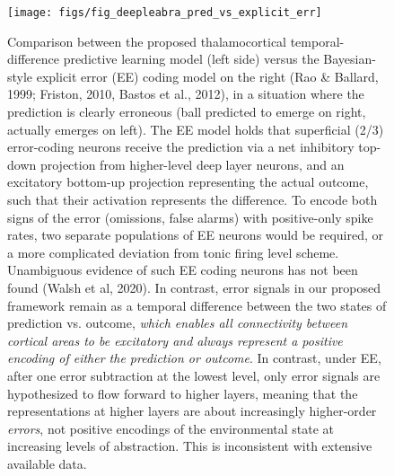 \documentclass[11pt,twoside]{article}
\newif\myifpdf
\begin{document}
\begin{figure}
  \centering\texttt{[image: figs/fig\_deepleabra\_pred\_vs\_explicit\_err]}
  \caption{Comparison between the proposed thalamocortical temporal-difference predictive learning model (left side) versus the Bayesian-style explicit error (EE) coding model on the right (Rao \& Ballard, 1999; Friston, 2010, Bastos et al., 2012), in a situation where the prediction is clearly erroneous (ball predicted to emerge on right, actually emerges on left).  The EE model holds that superficial (2/3) error-coding neurons receive the prediction via a net inhibitory top-down projection from higher-level deep layer neurons, and an excitatory bottom-up projection representing the actual outcome, such that their activation represents the difference.  To encode both signs of the error (omissions, false alarms) with positive-only spike rates, two separate populations of EE neurons would be required, or a more complicated deviation from tonic firing level scheme.  Unambiguous evidence of such EE coding neurons has not been found (Walsh et al, 2020).  In contrast, error signals in our proposed framework remain as a temporal difference between the two states of prediction vs. outcome, \emph{which enables all connectivity between cortical areas to be excitatory and always represent a positive encoding of either the prediction or outcome}.  In contrast, under EE, after one error subtraction at the lowest level, only error signals are hypothesized to flow forward to higher layers, meaning that the representations at higher layers are about increasingly higher-order \emph{errors}, not positive encodings of the environmental state at increasing levels of abstraction.  This is inconsistent with extensive available data.}
  \label{fig.ee}
\end{figure}
\end{document}
